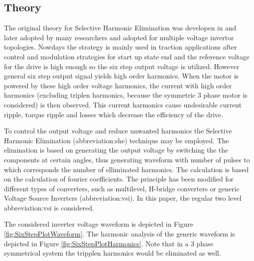 \documentclass[a4paper, twoside, 11pt]{article}
\begin{document}
    \subsection{Theory}\label{subsec:theory}
    The original theory for Selective Harmonic Elimination was developen in \cite{patel-Generalized-Techniques-of-Harmonic-Elimination-and-Voltage-Control-in-Thyristor-Inverters:-Part-I--Harmonic-Elimination, patel-Generalized-Techniques-of-Harmonic-Elimination-and-Voltage-Control-in-Thyristor-Inverters:-Part-II-----Voltage-Control-Techniques} and later adopted by many researchers and adopted for multiple voltage invertor topologies. Nowdays the strategy is mainly used in traction applications after control and modulation strategies for start up state end and the reference voltage for the drive is high enough so the six step output voltage is utilized. However general six step output signal yields high order harmonics. When the motor is powered by these high order voltage harmonics, the current with high order harmonics (excluding triplen harmonics, because the symmetric 3 phase motor is considered) is then observed. This current harmonics cause undesirable current ripple, torque ripple and losses \cite{mullner-Modelling-and-precalculation-of-additional-losses-of-inverter-fed-asynchronous-induction-machines-for-traction-applications} which decrease the efficiency of the drive.\par
    To control the output voltage and reduce unwanted harmonics the Selective Harmonic Elimination (\gls{abbreviation:she}) technique may be employed. The elimination is based on generating the output voltage by switching the the components at certain angles, thus generating waveform with number of pulses to which corresponds the number of elliminated harmonics. The calculation is based on the calculation of fourier coefficients. The principle has been modified for different types of converters, such as multilevel, H-bridge converters or generic Voltage Source Inverters (\gls{abbreviation:vsi}). In this paper, the regular two level \gls{abbreviation:vsi} is considered.\par
    The considered inverter voltage waveform is depicted in Figure \ref{fig:SixStepPlotWaveform}. The harmonic analysis of the generic waveform is depicted in Figure \ref{fig:SixStepPlotHarmonics}. Note that in a 3 phase symmetrical system the tripplen harmonics would be eliminated as well.
\end{document}
